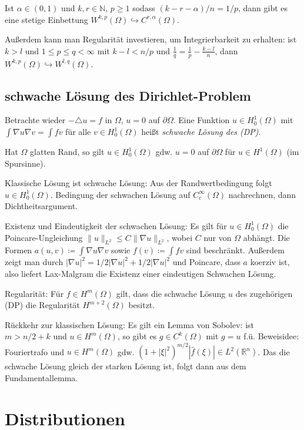 \documentclass[11pt,a4paper]{scrartcl}
\newcommand{\N}{\mathbb{N}} %
\newcommand{\R}{\mathbb{R}} %
\newcommand{\norm}[1]{\|#1\|}
\newcommand{\laplace}{\triangle}
\theoremstyle{plain}
\theoremstyle{definition}
\theoremstyle{remark}
\begin{document}
Ist $\alpha\in (0,1)$ und $k,r \in \N$, $p\geq 1$ sodass $(k-r-\alpha)/n=1/p$, dann gibt es eine stetige Einbettung $W^{k,p}(\Omega) \hookrightarrow C^{r,\alpha}(\Omega)$.

Außerdem kann man Regularität investieren, um Integrierbarkeit zu erhalten: ist $k>l$ und $1\leq p \leq q < \infty$ mit $k-l < n/p$ und $\frac{1}{q}=\frac{1}{p}-\frac{k-l}{n}$, dann $W^{k,p}(\Omega) \hookrightarrow W^{l,q}(\Omega)$.

\subsection{schwache Lösung des Dirichlet-Problem}

Betrachte wieder $-\laplace u = f$ in $\Omega$, $u=0$ auf $\partial\Omega$. Eine Funktion $u\in H^1_0(\Omega)$ mit $\int \nabla u \nabla v = \int fv$ für alle $v\in H^1_0(\Omega)$ heißt \emph{schwache Lösung des (DP)}. 

Hat $\Omega$ glatten Rand, so gilt $u\in H^1_0(\Omega)$ gdw. $u=0$ auf $\partial\Omega$ für $u\in H^1(\Omega)$ (im Spursinne).

Klassische Lösung ist schwache Lösung: Aus der Randwertbedingung folgt $u\in H^1_0(\Omega)$. Bedingung der schwachen Lösung auf $C_c^\infty(\Omega)$ nachrechnen, dann Dichtheitsargument.

Existenz und Eindeutigkeit der schwachen Lösung: Es gilt für $u\in H^1_0(\Omega)$ die Poincare-Ungleichung $\norm{u}_{L^2} \leq C \norm{\nabla u}_{L^2}$, wobei $C$ nur von $\Omega$ abhängt. Die Formen $a(u,v)\coloneqq \int \nabla u \nabla v$ sowie $f(v)\coloneqq \int fv$ sind beschränkt. Außerdem zeigt man durch $|\nabla u|^2 = 1/2|\nabla u|^2 + 1/2|\nabla u|^2$ und Poincare, dass $a$ koerziv ist, also liefert Lax-Malgram die Existenz einer eindeutigen Schwachen Lösung.

Regularität: Für $f\in H^m(\Omega)$ gilt, dass die schwache Lösung $u$ des zugehörigen (DP) die Regularität $H^{m+2}(\Omega)$ besitzt.

Rückkehr zur klassischen Lösung: Es gilt ein Lemma von Sobolev: ist $m > n/2 + k$ und $u\in H^m(\Omega)$, so gibt es $g\in C^k(\Omega)$ mit $g=u$ f.ü. Beweisidee: Fouriertrafo und $u\in H^m(\Omega)$ gdw. $(1+|\xi|^2)^{m/2} |\hat f(\xi)| \in L^2(\R^n)$. Das die schwache Lösung gleich der starken Lösung ist, folgt dann aus dem Fundamentallemma.

\section{Distributionen}
\end{document}
